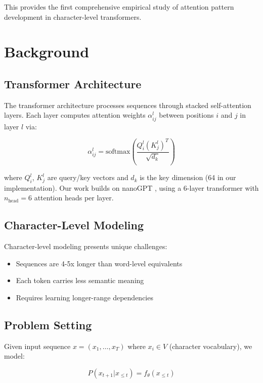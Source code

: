 \documentclass{article} %
\begin{document}
This provides the first comprehensive empirical study of attention pattern development in character-level transformers.

\section{Background}
\label{sec:background}

\subsection{Transformer Architecture}
The transformer architecture \citep{vaswani2017attention} processes sequences through stacked self-attention layers. Each layer computes attention weights $\alpha_{ij}^l$ between positions $i$ and $j$ in layer $l$ via:

\begin{equation}
    \alpha_{ij}^l = \text{softmax}\left(\frac{Q_i^l(K_j^l)^T}{\sqrt{d_k}}\right)
\end{equation}

where $Q_i^l$, $K_j^l$ are query/key vectors and $d_k$ is the key dimension (64 in our implementation). Our work builds on nanoGPT \citep{karpathy2023nanogpt}, using a 6-layer transformer with $n_\text{head}=6$ attention heads per layer.

\subsection{Character-Level Modeling}
Character-level modeling presents unique challenges:
\begin{itemize}
    \item Sequences are 4-5x longer than word-level equivalents \citep{bahdanau2014neural}
    \item Each token carries less semantic meaning
    \item Requires learning longer-range dependencies
\end{itemize}

\subsection{Problem Setting}
Given input sequence $x = (x_1, \ldots, x_T)$ where $x_i \in V$ (character vocabulary), we model:

\begin{equation}
    P(x_{t+1}|x_{\leq t}) = f_\theta(x_{\leq t})
\end{equation}
\end{document}
